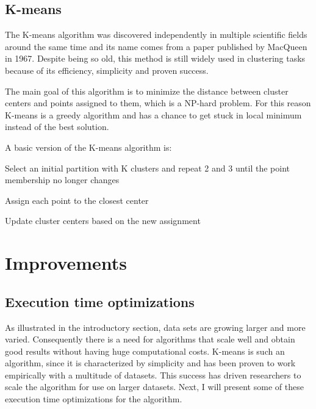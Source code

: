 \documentclass[12pt]{article}
\begin{document}
	\subsection{K-means}
	The K-means algorithm was discovered independently in multiple scientific fields around the same time and its name comes from a paper published by MacQueen in 1967\cite{DataClustering50yearsBeyondKmeans}. Despite being so old, this method is still widely used in clustering tasks because of its efficiency, simplicity and proven success.
	
	The main goal of this algorithm is to minimize the distance between cluster centers and points assigned to them, which is a NP-hard problem. For this reason K-means is a greedy algorithm and has a chance to get stuck in local minimum instead of the best solution\cite{DataClustering50yearsBeyondKmeans}.
	
	A basic version of the K-means algorithm is\cite{AlgorithmsForClusteringData}:
	\begin{compactenum}
		\item Select an initial partition with K clusters and repeat 2 and 3 until the point membership no longer changes
		\item Assign each point to the closest center
		\item Update cluster centers based on the new assignment
	\end{compactenum}
	
	\section{Improvements}
	
	\subsection{Execution time optimizations}
	As illustrated in the introductory section, data sets are growing larger and more varied. Consequently there is a need for algorithms that scale well and obtain good results without having huge computational costs. K-means is such an algorithm, since it is characterized by simplicity and has been proven to work empirically with a multitude of datasets\cite{DataClustering50yearsBeyondKmeans}. This success has driven researchers to scale the algorithm for use on larger datasets. Next, I will present some of these execution time optimizations for the algorithm.
	
\end{document}
